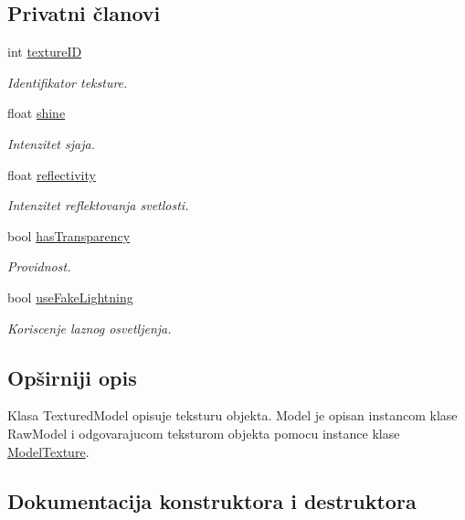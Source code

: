 \subsection*{Privatni članovi}
\begin{DoxyCompactItemize}
\item 
int \hyperlink{classtexture_1_1Texture_a0dca1304604e6b705acb0460b66fce36}{texture\+ID}
\begin{DoxyCompactList}\small\item\em Identifikator teksture. \end{DoxyCompactList}\item 
float \hyperlink{classtexture_1_1Texture_a7a74ed6a4d5fc91d1537fbf68e74ce03}{shine}
\begin{DoxyCompactList}\small\item\em Intenzitet sjaja. \end{DoxyCompactList}\item 
float \hyperlink{classtexture_1_1Texture_a230e6f2abbfc59eae1daf72eba177b90}{reflectivity}
\begin{DoxyCompactList}\small\item\em Intenzitet reflektovanja svetlosti. \end{DoxyCompactList}\item 
bool \hyperlink{classtexture_1_1Texture_add1146be92d76ac599fa032117e8b459}{has\+Transparency}
\begin{DoxyCompactList}\small\item\em Providnost. \end{DoxyCompactList}\item 
bool \hyperlink{classtexture_1_1Texture_aa14650f7cc629b9f5c0ed15f82b22cad}{use\+Fake\+Lightning}
\begin{DoxyCompactList}\small\item\em Koriscenje laznog osvetljenja. \end{DoxyCompactList}\end{DoxyCompactItemize}


\subsection{Opširniji opis}
Klasa Textured\+Model opisuje teksturu objekta. Model je opisan instancom klase Raw\+Model i odgovarajucom teksturom objekta pomocu instance klase \hyperlink{classtexture_1_1Texture}{Model\+Texture}. 

\subsection{Dokumentacija konstruktora i destruktora}
\mbox{\label{classtexture_1_1Texture_a8a404382554b8e2625978824202c42b9}} 
